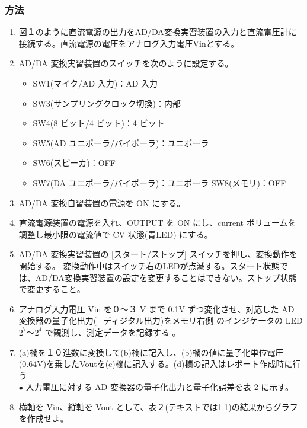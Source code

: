 \documentclass[10pt]{article}
\begin{document}
\subsubsection{方法}

\begin{enumerate}
\item 図１のように直流電源の出力をAD/DA変換実習装置の入力と直流電圧計に接続する。直流電源の電圧をアナログ入力電圧Vinとする。
\item  AD/DA 変換実習装置のスイッチを次のように設定する。
\begin{itemize}
  \item SW1(マイク/AD 入力)：AD 入力 
  \item SW3(サンプリングクロック切換)：内部 
  \item SW4(8 ビット/4 ビット)：4 ビット 
  \item SW5(AD ユニポーラ/バイポーラ)：ユニポーラ 
  \item SW6(スピーカ)：OFF 
  \item SW7(DA ユニポーラ/バイポーラ)：ユニポーラ SW8(メモリ)：OFF
\end{itemize}
\item AD/DA 変換自習装置の電源を ON にする。 
\item 直流電源装置の電源を入れ、OUTPUT を ON にし、current ボリュームを調整し最小限の電流値で CV 状態(青LED) にする。
\item AD/DA 変換実習装置の [スタート/ストップ] スイッチを押し、変換動作を開始する。 変換動作中はスイッチ右のLEDが点滅する。スタート状態では、AD/DA変換実習装置の設定を変更することはできない。ストップ状態で変更すること。
\item アナログ入力電圧 Vin を０～３ V まで 0.1V ずつ変化させ、対応した AD 変換器の量子化出力(=ディジタル出力)をメモリ右側 のインジケータの LED${2^7～2^4}$ で観測し、測定データを記録する 。 
\item (a)欄を１０進数に変換して(b)欄に記入し、(b)欄の値に量子化単位電圧(0.64V)を乗したVoutを(c)欄に記入する。(d)欄の記入はレポート作成時に行う \\
$\bullet$ 入力電圧に対する AD 変換器の量子化出力と量子化誤差を表 2 に示す。
\item 横軸を Vin、縦軸を Vout として、表２(テキストでは1.1)の結果からグラフを作成せよ。
\end{enumerate}
\end{document}
